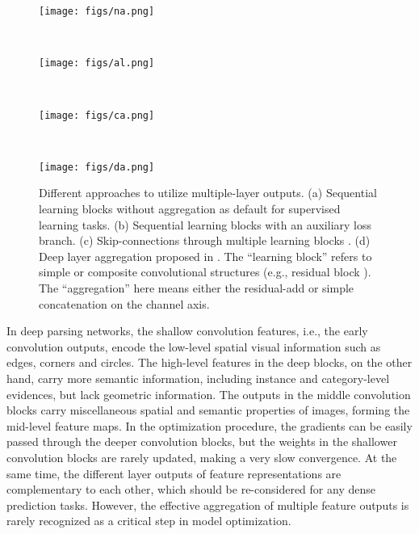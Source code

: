 \documentclass[10pt,twocolumn,twoside]{IEEEtran}
\begin{document}
\begin{figure*}[t]
\centering
    \begin{minipage}{0.4\textwidth}
        \texttt{[image: figs/na.png]}
	   \label{FIG:NA}
    \end{minipage}
    ~
    \begin{minipage}{0.4\textwidth}
        \texttt{[image: figs/al.png]}
	   \label{FIG:AL}
    \end{minipage}
   ~
    \begin{minipage}{0.4\textwidth}
        \texttt{[image: figs/ca.png]}
	   \label{FIG:CA}
    \end{minipage}
    ~
    \begin{minipage}{0.4\textwidth}
        \texttt{[image: figs/da.png]}
	   \label{FIG:DA}
    \end{minipage}    
\caption{Different approaches to utilize multiple-layer outputs. (a) Sequential learning blocks without aggregation as default for supervised learning tasks. (b) Sequential learning blocks with an auxiliary loss branch. (c) Skip-connections through multiple learning blocks \cite{CVPR17:DENSENET}. (d) Deep layer aggregation proposed in \cite{CVPR18:DLA}. The ``learning block'' refers to simple or composite convolutional structures (e.g., residual block \cite{CVPR16:RESNET}). The ``aggregation'' here means either the residual-add or simple concatenation on the channel axis.}
\label{FIG:4AGGREGATIONS}
\end{figure*}

In deep parsing networks, the shallow convolution features, i.e., the early convolution outputs, encode the low-level spatial visual information such as edges, corners and circles. The high-level features in the deep blocks, on the other hand, carry more semantic information, including instance and category-level evidences, but lack geometric information. The outputs in the middle convolution blocks carry miscellaneous spatial and semantic properties of images, forming the mid-level feature maps. In the optimization procedure, the gradients can be easily passed through the deeper convolution blocks, but the weights in the shallower convolution blocks are rarely updated, making a very slow convergence. At the same time, the different layer outputs of feature representations are complementary to each other, which should be re-considered for any dense prediction tasks. However, the effective aggregation of multiple feature outputs is rarely recognized as a critical step in model optimization.
\end{document}
